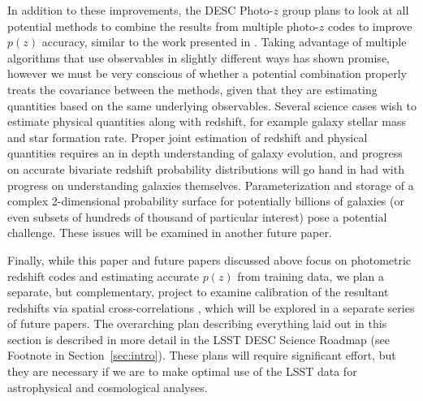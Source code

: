 In addition to these improvements, the DESC Photo-$z$ group plans to look at all potential methods to combine the results from multiple photo-$z$ codes to improve $p(z)$ accuracy, similar to the work presented in \citet{Dahlen:13,Carrascokind:14,Duncan:18}.  Taking advantage of multiple algorithms that use observables in slightly different ways has shown promise, however we must be very conscious of whether a potential combination properly treats the covariance between the methods, given that they are estimating quantities based on the same underlying observables.
Several science cases wish to estimate physical quantities along with redshift, for example galaxy stellar mass and star formation rate.  Proper joint estimation of redshift and physical quantities requires an in depth understanding of galaxy evolution, and progress on accurate bivariate redshift probability distributions will go hand in had with progress on understanding galaxies themselves.  Parameterization and storage of a complex 2-dimensional probability surface for potentially billions of galaxies (or even subsets of hundreds of thousand of particular interest) pose a potential challenge.  These issues will be examined in another future paper.

Finally, while this paper and future papers discussed above focus on photometric redshift codes and estimating accurate $p(z)$ from training data, we plan a separate, but complementary, project to examine calibration of the resultant redshifts via spatial cross-correlations \citep{Newman:2008}, which will be explored in a separate series of future papers.  The overarching plan describing everything laid out in this section is described in more detail in the LSST DESC Science Roadmap (see Footnote in Section~\ref{sec:intro}).  These plans will require significant effort, but they are necessary if we are to make optimal use of the LSST data for astrophysical and cosmological analyses.

